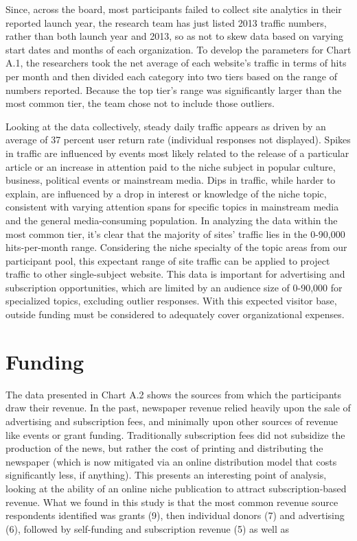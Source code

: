 Since, across the board, most participants failed to collect site analytics in
their reported launch year, the research team has just listed 2013 traffic
numbers, rather than both launch year and 2013, so as not to skew data
based on varying start dates and months of each organization.
To develop the parameters for Chart A.1, the researchers took the net average
of each website’s traffic in terms of hits per month and then divided each
category into two tiers based on the range of numbers reported. Because
the top tier’s range was significantly larger than the most common tier, the
team chose not to include those outliers.


Looking at the data collectively, steady daily traffic appears as driven by an
average of 37 percent user return rate (individual responses not displayed).
Spikes in traffic are influenced by events most likely related to the release
of a particular article or an increase in attention paid to the niche subject
in popular culture, business, political events or mainstream media. Dips in
traffic, while harder to explain, are influenced by a drop in interest or knowledge
of the niche topic, consistent with varying attention spans for specific
topics in mainstream media and the general media-consuming population.
In analyzing the data within the most common tier, it’s clear that the majority
of sites’ traffic lies in the 0-90,000 hits-per-month range. Considering the
niche specialty of the topic areas from our participant pool, this expectant
range of site traffic can be applied to project traffic to other single-subject
website. This data is important for advertising and subscription opportunities,
which are limited by an audience size of 0-90,000 for specialized topics,
excluding outlier responses. With this expected visitor base, outside funding
must be considered to adequately cover organizational expenses.

\section{Funding}
The data presented in Chart A.2 shows the sources from which the participants
draw their revenue. In the past, newspaper revenue relied heavily
upon the sale of advertising and subscription fees, and minimally upon
other sources of revenue like events or grant funding. Traditionally subscription
fees did not subsidize the production of the news, but rather the
cost of printing and distributing the newspaper (which is now mitigated via
an online distribution model that costs significantly less, if anything). This
presents an interesting point of analysis, looking at the ability of an online
niche publication to attract subscription-based revenue.
What we found in this study is that the most common revenue source
respondents identified was grants (9), then individual donors (7) and advertising
(6), followed by self-funding and subscription revenue (5) as well as

